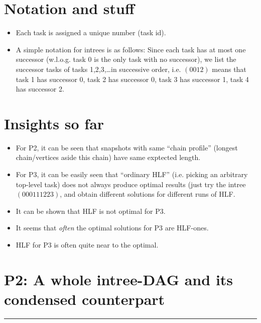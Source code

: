 \documentclass{report}
\begin{document}
\begin{multicols}{3}
  
\section{Notation and stuff}

\begin{itemize}
\item Each task is assigned a unique number (task id).
\item A simple notation for intrees is as follows: Since each task has at most one successor (w.l.o.g. task 0 is the only task with no successor), we list the successor tasks of tasks 1,2,3,\dots in successive order, i.e. $(0 0 1 2)$ means that task 1 has successor 0, task 2 has successor 0, task 3 has successor 1, task 4 has successor 2.
\end{itemize}

\section{Insights so far}

\begin{itemize}
\item For P2, it can be seen that snapshots with same ``chain profile'' (longest chain/vertices aside this chain) have same exptected length.
\item For P3, it can be easily seen that ``ordinary HLF'' (i.e. picking an arbitrary top-level task) does not always produce optimal results (just try the intree $(0 0 0 1 1 1 2 2 3)$, and obtain different solutions for different runs of HLF.
\item It can be shown that HLF is not optimal for P3.
\item It seems that \emph{often} the optimal solutions for P3 are HLF-ones.
\item HLF for P3 is often quite near to the optimal.
\end{itemize}

\vfill

\section{P2: A whole intree-DAG and its condensed counterpart}



\end{multicols}

\hrule
\end{document}
